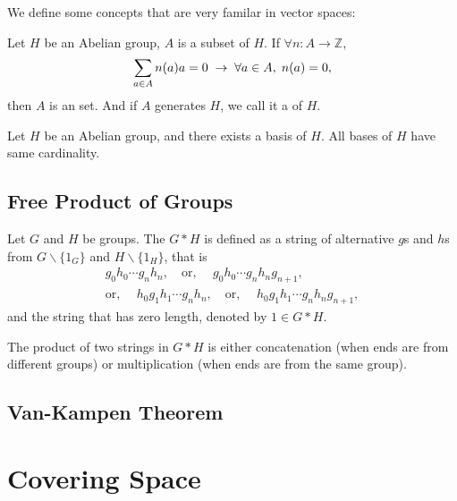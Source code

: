 \documentclass[openany, oneside, a5paper]{book}
\begin{document}
We define some concepts that are very familar in vector spaces:
\begin{definition}
    Let $H$ be an Abelian group, $A$ is a subset of $H$.
    If $\forall n \colon A \to \mathbb Z$, 
    \begin{equation*}
        \sum_{a \in A} n(a) a = 0
        \;\rightarrow\;
        \forall a \in A,\;
        n(a) = 0,
    \end{equation*}
    then $A$ is an  set.
    And if $A$ generates $H$, we call it a  of $H$.
\end{definition}

\begin{theorem}
    Let $H$ be an Abelian group, and there exists a basis of $H$.
    All bases of $H$ have same cardinality.
\end{theorem}

\section{Free Product of Groups}

\begin{definition}
    Let $G$ and $H$ be groups.
    The  $G * H$ is defined as a string of alternative $g$s and $h$s from $G \backslash \{1_G\}$ and $H \backslash \{1_H\}$, that is
    \begin{align}
        g_0 h_0 \cdots g_n h_n,
        \quad
        \text{or, }
        \quad
        g_0 h_0 \cdots g_n h_n g_{n+1},
        \\
        \text{or, }
        \quad
        h_0 g_1 h_1 \cdots g_n h_n,
        \quad
        \text{or, }
        \quad
        h_0 g_1 h_1 \cdots g_n h_n g_{n+1},
    \end{align}
    and the string that has zero length, denoted by $1 \in G * H$.

    The product of two strings in $G * H$ is either concatenation (when ends are from different groups) or multiplication (when ends are from the same group). 
\end{definition}

\section{Van-Kampen Theorem}

\chapter{Covering Space}
\end{document}
